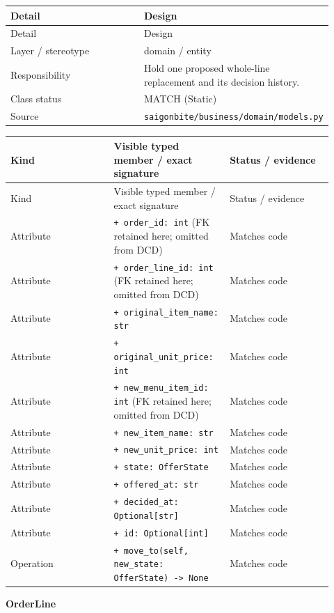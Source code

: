 \begin{longtable}{>{\raggedright\arraybackslash}p{0.4600\linewidth}>{\raggedright\arraybackslash}p{0.4600\linewidth}}
Detail & Design \\
\hline\endfirsthead
Detail & Design \\
\hline\endhead
Layer / stereotype & domain / \guillemotleft{}entity\guillemotright{} \\
Responsibility & Hold one proposed whole-line replacement and its decision history. \\
Class status & MATCH (Static) \\
Source & \texttt{saigonbite/\allowbreak{}business/\allowbreak{}domain/\allowbreak{}models.\allowbreak{}py} \\
\end{longtable}
\begin{longtable}{>{\raggedright\arraybackslash}p{0.3067\linewidth}>{\raggedright\arraybackslash}p{0.3067\linewidth}>{\raggedright\arraybackslash}p{0.3067\linewidth}}
Kind & Visible typed member / exact signature & Status / evidence \\
\hline\endfirsthead
Kind & Visible typed member / exact signature & Status / evidence \\
\hline\endhead
Attribute & \texttt{+ order\_\allowbreak{}id: int} (FK retained here; omitted from DCD) & Matches code \\
Attribute & \texttt{+ order\_\allowbreak{}line\_\allowbreak{}id: int} (FK retained here; omitted from DCD) & Matches code \\
Attribute & \texttt{+ original\_\allowbreak{}item\_\allowbreak{}name: str} & Matches code \\
Attribute & \texttt{+ original\_\allowbreak{}unit\_\allowbreak{}price: int} & Matches code \\
Attribute & \texttt{+ new\_\allowbreak{}menu\_\allowbreak{}item\_\allowbreak{}id: int} (FK retained here; omitted from DCD) & Matches code \\
Attribute & \texttt{+ new\_\allowbreak{}item\_\allowbreak{}name: str} & Matches code \\
Attribute & \texttt{+ new\_\allowbreak{}unit\_\allowbreak{}price: int} & Matches code \\
Attribute & \texttt{+ state: OfferState} & Matches code \\
Attribute & \texttt{+ offered\_\allowbreak{}at: str} & Matches code \\
Attribute & \texttt{+ decided\_\allowbreak{}at: Optional[str]} & Matches code \\
Attribute & \texttt{+ id: Optional[int]} & Matches code \\
Operation & \texttt{+ move\_\allowbreak{}to(self, new\_\allowbreak{}state: OfferState) -\textgreater{} None} & Matches code \\
\end{longtable}
\textbf{OrderLine}

